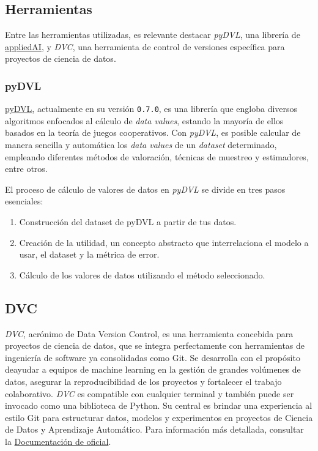 \subsection{Herramientas}

Entre las herramientas utilizadas, es relevante
destacar \textit{pyDVL}, una librería de
\href{https://www.appliedai.de/en/}{appliedAI}, y
\textit{DVC}, una herramienta de control de versiones
específica para proyectos de ciencia de datos.

\subsubsection*{pyDVL}

\href{https://aai-institute.github.io/pyDVL/0.7.0/}{pyDVL},
actualmente en su versión \texttt{0.7.0}, es una
librería que engloba diversos algoritmos enfocados al cálculo
de \textit{data values}, estando la mayoría de ellos basados en
la teoría de juegos cooperativos. Con \textit{pyDVL}, es posible
calcular de manera sencilla y automática los \textit{data values}
de un \textit{dataset} determinado, empleando diferentes métodos de
valoración, técnicas de muestreo y estimadores, entre otros. 

El proceso de cálculo de valores de datos en
\textit{pyDVL} se divide en tres pasos esenciales:
\begin{enumerate}
    \item Construcción del dataset de pyDVL a
    partir de tus datos.
    \item Creación de la utilidad, un concepto abstracto
    que interrelaciona el modelo a usar, el dataset y la
    métrica de error.
    \item Cálculo de los valores de datos utilizando el
    método seleccionado.
\end{enumerate}


\subsection*{DVC}

\textit{DVC}, acrónimo de Data Version Control,
es una herramienta concebida para proyectos de ciencia de
datos, que se integra perfectamente con herramientas de
ingeniería de software ya consolidadas como Git. Se
desarrolla con el propósito deayudar a equipos de machine learning
en la gestión de grandes volúmenes de datos, asegurar la
reproducibilidad de los proyectos y fortalecer el
trabajo colaborativo. \textit{DVC} es compatible con
cualquier terminal y también puede ser invocado como
una biblioteca de Python. Su central  es brindar una experiencia
al estilo Git para estructurar datos, modelos y experimentos en
proyectos de Ciencia de Datos y Aprendizaje Automático. Para
información más detallada, consultar
la \href{https://dvc.org/doc/user-guide}{Documentación de oficial}.


